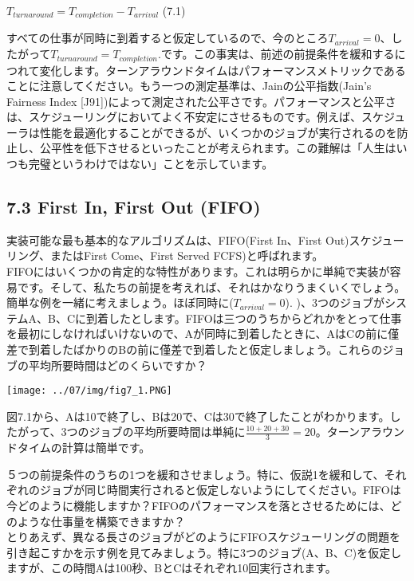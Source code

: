 \(T_{turnaround} = T_{completion} - T_{arrival}\) (7.1)

すべての仕事が同時に到着すると仮定しているので、今のところ\(T_{arrival} = 0\)、したがって\(T_{turnaround} = T_{completion}\).です。この事実は、前述の前提条件を緩和するにつれて変化します。ターンアラウンドタイムはパフォーマンスメトリックであることに注意してください。もう一つの測定基準は、Jainの公平指数(Jain's
Fairness Index
{[}J91{]})によって測定された公平さです。パフォーマンスと公平さは、スケジューリングにおいてよく不安定にさせるものです。例えば、スケジューラは性能を最適化することができるが、いくつかのジョブが実行されるのを防止し、公平性を低下させるといったことが考えられます。この難解は「人生はいつも完璧というわけではない」ことを示しています。

\hypertarget{first-in-first-out-fifo}{%
\subsection*{7.3 First In, First Out
(FIFO)}\label{first-in-first-out-fifo}}

実装可能な最も基本的なアルゴリズムは、FIFO(First In、First
Out)スケジューリング、またはFirst Come、First Served
FCFS)と呼ばれます。\\
FIFOにはいくつかの肯定的な特性があります。これは明らかに単純で実装が容易です。そして、私たちの前提を考えれば、それはかなりうまくいくでしょう。簡単な例を一緒に考えましょう。ほぼ同時に(\(T_{arrival} = 0\)).
)、3つのジョブがシステムA、B、Cに到着したとします。FIFOは三つのうちからどれかをとって仕事を最初にしなければいけないので、Aが同時に到着したときに、AはCの前に僅差で到着したばかりのBの前に僅差で到着したと仮定しましょう。これらのジョブの平均所要時間はどのくらいですか？

\texttt{[image: ../07/img/fig7\_1.PNG]}

図7.1から、Aは10で終了し、Bは20で、Cは30で終了したことがわかります。したがって、3つのジョブの平均所要時間は単純に\(\frac{10+20+30}{3}=20\)。ターンアラウンドタイムの計算は簡単です。

５つの前提条件のうちの1つを緩和させましょう。特に、仮説1を緩和して、それぞれのジョブが同じ時間実行されると仮定しないようにしてください。FIFOは今どのように機能しますか？FIFOのパフォーマンスを落とさせるためには、どのような仕事量を構築できますか？\\
とりあえず、異なる長さのジョブがどのようにFIFOスケジューリングの問題を引き起こすかを示す例を見てみましょう。特に3つのジョブ(A、B、C)を仮定しますが、この時間Aは100秒、BとCはそれぞれ10回実行されます。

